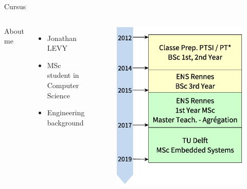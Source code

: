 
\begin{frame}{Cursus}
	\begin{columns}
		\begin{center}
			About me
		\end{center}
			\begin{itemize}
				\item Jonathan LEVY
				\item MSc student in Computer Science
				\item Engineering background
			\end{itemize}

		\begin{figure}
			\centering
			\includegraphics[width=0.7\linewidth]{timeline_studies}
		\end{figure}
	\end{columns}
\end{frame}